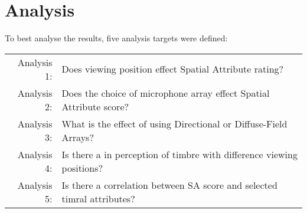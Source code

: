 
\section{Analysis}
	To best analyse the results, five analysis targets were defined:

	\begin{tabular}{r p{5.5cm}}
		Analysis 1: & Does viewing position effect Spatial Attribute rating? \\
		Analysis 2: & Does the choice of microphone array effect Spatial Attribute score? \\
		Analysis 3: & What is the effect of using Directional or Diffuse-Field Arrays? \\ 
		Analysis 4: & Is there a in perception of timbre with difference viewing positions? \\
		Analysis 5: & Is there a correlation between SA score and selected timral attributes?
	\end{tabular}

	
	
	
	
	

	
